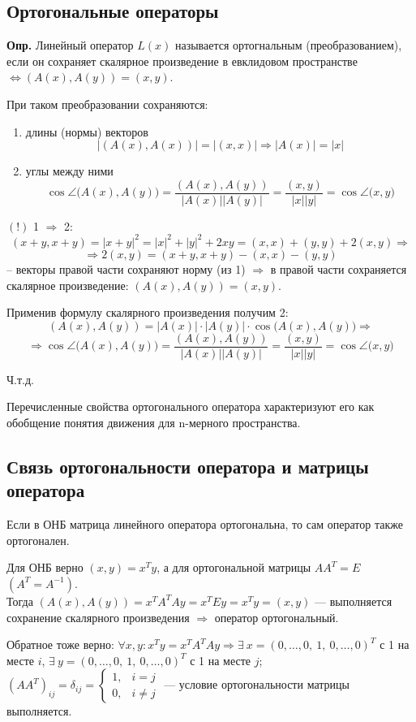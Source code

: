 \documentclass[12pt]{article}
\begin{document}
\subsection*{Ортогональные операторы}
\textbf{Опр.} Линейный оператор $L(x)$ называется ортогнальным (преобразованием),
если он сохраняет скалярное произведение в евклидовом пространстве
$\Leftrightarrow (A(x), A(y)) = (x, y)$.

При таком преобразовании сохраняются:
\begin{enumerate}
    \item длины (нормы) векторов
          \[|(A(x), A(x))| = |(x, x)| \Rightarrow |A(x)| = |x|\]
    \item углы между ними
          \[\cos{\angle\bigl(A(x), A(y)\bigr)} =
              \frac{(A(x), A(y))}{|A(x)||A(y)|} =
              \frac{(x, y)}{|x||y|} = \cos{\angle\bigl(x, y\bigr)}\]
\end{enumerate}

\textbf{$(!)$} 1 $\Rightarrow$ 2:
\[(x+y, x+y) = |x+y|^2 = |x|^2 + |y|^2 + 2xy = (x, x) + (y, y) + 2(x, y) \Rightarrow \]
\[ \Rightarrow 2(x, y) = (x+y, x+y) - (x, x) - (y, y)\]
-- векторы правой части сохраняют норму (из 1) $\Rightarrow$
в правой части сохраняется скалярное произведение: $(A(x), A(y)) = (x, y)$.

Применив формулу скалярного произведения получим 2:
\[ (A(x), A(y)) = |A(x)|\cdot|A(y)|\cdot\cos{\bigl(A(x), A(y)\bigr)} \Rightarrow \]
\[ \Rightarrow \cos{\angle\bigl(A(x), A(y)\bigr)} = \frac{(A(x), A(y))}{|A(x)||A(y)|} =
    \frac{(x, y)}{|x||y|} = \cos{\angle\bigl(x, y\bigr)} \]

Ч.т.д.

Перечисленные свойства ортогонального оператора
характеризуют его как обобщение понятия движения
для n-мерного пространства.
\subsection*{Связь ортогональности оператора и матрицы оператора}
\hspace{36pt}
Если в ОНБ матрица линейного оператора ортогональна, то сам оператор также ортогонален.

Для ОНБ верно $(x, y) = x^Ty$, а для ортогональной матрицы $AA^T = E$ $(A^T = A^{-1})$.\\
Тогда $(A(x), A(y)) = x^T A^T Ay = x^T Ey = x^Ty = (x,y)$ ---
выполняется сохранение скалярного произведения $\Rightarrow$ оператор ортогональный.

Обратное тоже верно: $\forall x, y: x^Ty = x^TA^TAy \Rightarrow
    \exists\ x = (0, \dots, 0,\ 1,\ 0, \dots, 0)^T$ с 1 на месте $i$,
$\exists\ y = (0, \dots, 0,\ 1,\ 0, \dots, 0)^T$ с 1 на месте $j$;
$(AA^T)_{ij} = \delta_{ij} =
    \begin{cases}
        1, & i = j    \\
        0, & i \neq j
    \end{cases}$
--- условие ортогональности матрицы выполняется.
\end{document}
